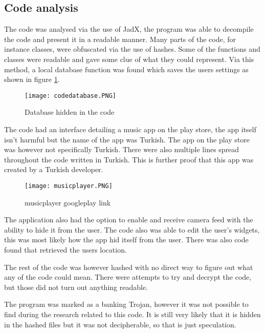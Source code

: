 \subsection{Code analysis}

The code was analysed via the use of JadX, the program was able to decompile the code and present it in a readable manner. 
Many parts of the code, for instance classes, were obfuscated via the use of hashes.
Some of the functions and classes were readable and gave some clue of what they could represent. 
Via this method, a local database function was found which saves the users settings as shown in figure \ref{tim-database}.

\begin{figure}[H]
    \texttt{[image: codedatabase.PNG]}
    \caption{Database hidden in the code}
    \label{tim-database}
\end{figure}

The code had an interface detailing a music app on the play store, the app itself isn’t harmful but the name of the app was Turkish. 
The app on the play store was however not specifically Turkish. 
There were also multiple lines spread throughout the code written in Turkish. 
This is further proof that this app was created by a Turkish developer.

\begin{figure}[H]
    \texttt{[image: musicplayer.PNG]}
    \caption{musicplayer googleplay link}
    \label{tim-music}
\end{figure}

The application also had the option to enable and receive camera feed with the ability to hide it from the user. 
The code also was able to edit the user’s widgets, this was most likely how the app hid itself from the user. 
There was also code found that retrieved the users location.
 
The rest of the code was however hashed with no direct way to figure out what any of the code could mean. 
There were attempts to try and decrypt the code, but those did not turn out anything readable.

The program was marked as a banking Trojan, however it was not possible to find during the research related to this code.
It is still very likely that it is hidden in the hashed files but it was not decipherable, so that is just speculation.

